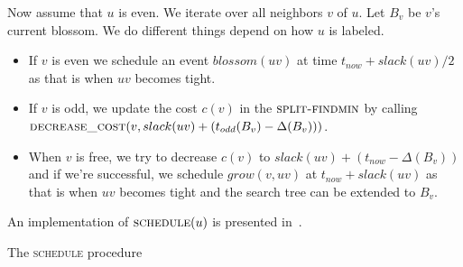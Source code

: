 Now assume that $u$ is even. We iterate over all neighbors $v$ of $u$. Let $B_v$ be $v$'s current blossom. We do different things depend on how $u$ is labeled.
\begin{itemize}
    \item If $v$ is even we schedule an event $blossom(uv)$ at time $t_{now} + slack(uv)/2$ as that is when $uv$ becomes tight.
    \item If $v$ is odd, we update the cost $c(v)$ in the $\textsc{split-findmin}$ by calling $\textsc{decrease\_cost}(v, slack(uv) + (t_{odd}(B_v) - \Delta(B_v)))$.
    \item When $v$ is free, we try to decrease $c(v)$ to $slack(uv) + (t_{now} - \Delta(B_v))$ and if we're successful, we schedule $grow(v, uv)$ at $t_{now} + slack(uv)$ as that is when $uv$ becomes tight and the search tree can be extended to $B_v$.
\end{itemize}

An implementation of $\textsc{schedule}(u)$ is presented in~.

\begin{algorithm}
\caption{The \textsc{schedule} procedure}\label{alg:schedule}
\begin{algorithmic}[1]
    \EndIf
    \Else
    \EndIf
\Else {}
        \EndIf
        \Else
            \EndIf
        \EndIf
    \EndFor
\EndIf
\EndProcedure
\end{algorithmic}
\end{algorithm}

